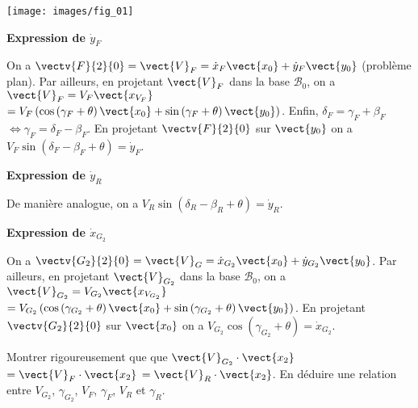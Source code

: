 \documentclass[11pt]{article}
\begin{document}
\begin{UPSTIcorrige}

\begin{center}
\texttt{[image: images/fig\_01]}
\end{center}
\textbf{Expression de $\dot{y}_F$}

On a  $\vectv{F}{2}{0}=\vect{V}_F = \dot{x}_F \vect{x_0} +\dot{y}_F \vect{y_0}$ (problème plan).  
Par ailleurs, en projetant $\vect{V}_F $ dans la base $\mathcal{B}_0$, on a $\vect{V}_F =V_F\vect{x_{V_F}}$ 
$=V_F\left(\cos\left(\gamma_F +\theta \right)\vect{x_0}+\sin\left(\gamma_F +\theta \right)\vect{y_0}\right)$. Enfin, $\delta_F=\gamma_F+\beta_F$ $\Leftrightarrow \gamma_F = \delta_F-\beta_F  $. 
En projetant  $\vectv{F}{2}{0}$ sur $\vect{y_0}$ on a $V_F\sin\left(\delta_F-\beta_F +\theta \right) = \dot{y}_F $.

\textbf{Expression de $\dot{y}_R$}

De manière analogue, on a $V_R \sin\left(\delta_R-\beta_R +\theta \right) = \dot{y}_R $.

\textbf{Expression de $\dot{x}_{G_2}$}

On a  $\vectv{G_2}{2}{0}=\vect{V}_G = \dot{x}_{G_2} \vect{x_0} +\dot{y}_{G_2} \vect{y_0}$.  
Par ailleurs, en projetant $\vect{V}_{G_2} $ dans la base $\mathcal{B}_0$, on a $\vect{V}_{G_2} =V_{G_2}\vect{x_{V_{G_2}}}$ 
$=V_{G_2}\left(\cos\left(\gamma_{G_2} +\theta \right)\vect{x_0}+\sin\left(\gamma_{G_2} +\theta \right)\vect{y_0}\right)$. 
En projetant  $\vectv{{G_2}}{2}{0}$ sur $\vect{x_0}$ on a $V_{G_2}\cos\left(\gamma_{G_2} +\theta \right) = \dot{x}_{G_2} $.


\end{UPSTIcorrige}



\UPSTIquestion Montrer rigoureusement que que $\vect{V}_{G_2}\cdot\vect{x_2}$ $=\vect{V}_{F}\cdot\vect{x_2}$ $=\vect{V}_{R}\cdot\vect{x_2}$. En déduire une relation entre $V_{G_2}$, $\gamma_{G_2}$, $V_F$, $\gamma_F$, $V_R$ et $\gamma_R$. 
\end{document}
